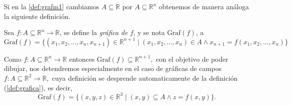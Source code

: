 \begin{obs} Si en la \autoref{def:grafm1} cambiamos  $A \subseteq \mathbb{R}$ por $A \subseteq \mathbb{R}^{n}$  obtenemos de manera an\'aloga la siguiente definici\'on.    
\end{obs}



\begin{definition}  \label{def:grafica}
 
 Sea \( f: A  \subseteq  \mathbb{R}^n \rightarrow \mathbb{R}\),  se define la \textit{gráfica de $f$}, y se nota $\text{Graf}(f)$,  a
 \[
\text{Graf}(f)=\{(x_1,x_2,...,x_n,x_{n+1})\in \mathbb{R}^{n+1} \;|\; (x_1,x_2,...,x_n) \in A \land x_{n+1}= f(x_1,x_2,...,x_n) \}
 \]

\end{definition}
\begin{obs}  Como \( f: A  \subseteq  \mathbb{R}^n \rightarrow \mathbb{R}\)  entonces $\text{Graf}(f)  \subseteq  \mathbb{R}^{n+1},$  con el objetivo de poder dibujar,  nos detendremos especialmente en el caso de gr\'aficas de  campos  $f: A\subseteq \mathbb{R}^2 \rightarrow \mathbb{R},$ cuya definici\'on se desprende automaticamente  de la definici\'on  (\ref{def:grafica}),  es decir, 
 \[
\text{Graf}(f)=\{(x,y,z)\in \mathbb{R}^3 \;|\;(x,y)\subseteq A \land z=f(x,y) \}.
 \]
\end{obs}

 



